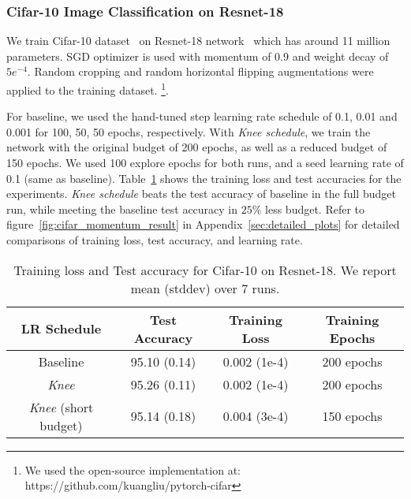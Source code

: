 \documentclass[twoside,11pt]{article}
\newcommand{\lrschedule}{\textit{Knee schedule}}
\newcommand{\lrscheduleshort}{\textit{Knee}}
\begin{document}
\subsubsection{Cifar-10 Image Classification on Resnet-18}

We train Cifar-10 dataset~\citep{cifar-10-dataset} on Resnet-18 network~\citep{resnet_he_2016} which has around 11 million parameters. SGD optimizer is used with momentum of 0.9 and weight decay of $5e^{-4}$. Random cropping and random horizontal flipping augmentations were applied to the training dataset. \footnote{We used the open-source implementation at: https://github.com/kuangliu/pytorch-cifar}. 

For baseline, we used the hand-tuned step learning rate schedule of 0.1, 0.01 and 0.001 for 100, 50, 50 epochs, respectively. With \lrschedule{}, we train the network with the original budget of 200 epochs, as well as a reduced budget of 150 epochs. We used 100 explore epochs for both runs, and a seed learning rate of 0.1 (same as baseline).
Table~\ref{tab:cifar_results_train_loss_test_acc} shows the training loss and test accuracies for the experiments. \lrschedule{} beats the test accuracy of baseline in the full budget run, while meeting the baseline test accuracy in $25\%$ less budget. Refer to figure~\ref{fig:cifar_momentum_result} in Appendix~\ref{sec:detailed_plots} for detailed comparisons of training loss, test accuracy, and learning rate.

\begin{table}[h]
    \small
\centering
\caption{Training loss and Test accuracy for Cifar-10 on Resnet-18. We report mean (stddev) over 7 runs.} 
\label{tab:cifar_results_train_loss_test_acc}
\begin{tabular}{cccc}
\toprule
\multirow{1}{*}{LR Schedule} & Test Accuracy & Training Loss & Training Epochs \\
\midrule
  Baseline   & \multirow{1}{*}{95.10 (0.14)}  & \multirow{1}{*}{0.002 (1e-4)}  & 200 epochs \\ 

  \lrscheduleshort{}     & \multirow{1}{*}{95.26 (0.11)} &  \multirow{1}{*}{0.002 (1e-4)} & 200 epochs \\
   
  
  \lrscheduleshort{} (short budget)     & \multirow{1}{*}{95.14 (0.18)} &  \multirow{1}{*}{0.004 (3e-4)}  & 150 epochs \\  
\bottomrule
\end{tabular}
\end{table}
\end{document}
